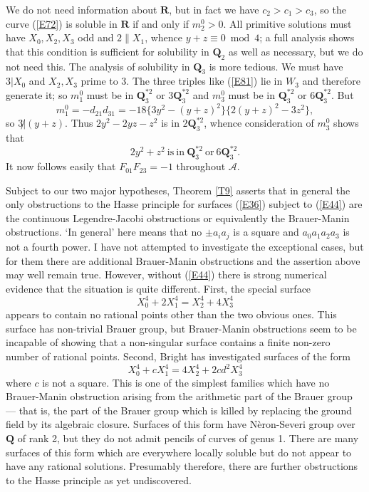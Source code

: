 \documentclass[12pt]{article}
\def\bQ{{\mathbf Q}}
\def\bR{{\mathbf R}}
\def\sA{{\mathcal A}}
\begin{document}
We do not need information about $\bR$, but in fact
we have $c_2>c_1>c_3$, so the curve (\ref{E72}) is
soluble in $\bR$ if and only if $m_2^0>0$. All primitive
solutions must have $X_0,X_2,X_3$ odd and $2\|X_1$, whence
$y+z\equiv0\bmod4$; a full analysis shows that this condition
is sufficient for solubility in $\bQ_2$ as well as necessary,
but we do not need this. The analysis of solubility in $\bQ_3$
is more tedious. We must have $3|X_0$ and $X_2,X_3$ prime to
3. The three triples like (\ref{E81}) lie in
$W_3$ and therefore generate it; so $m_1^0$ must be in
$\bQ^{*2}_3$ or $3\bQ^{*2}_3$ and $m_3^0$ must be in
$\bQ^{*2}_3$ or $6\bQ^{*2}_3$. But
\[ m_1^0=-d_{21}d_{31}=-18\{3y^2-(y+z)^2\}\{2(y+z)^2-3z^2\}, \]
so $3{\not|}(y+z)$. Thus $2y^2-2yz-z^2$ is in $2\bQ_3^{*2}$,
whence consideration of $m_3^0$ shows that
\[ 2y^2+z^2 \mathrm{~is~in~} \bQ^{*2}_3 \mathrm{~or~}
6\bQ^{*2}_3. \]
It now follows easily that
$F_{01}F_{23}=-1$ throughout $\sA$.

\medskip

Subject to our two major hypotheses, Theorem \ref{T9} asserts
that in general the only obstructions to the Hasse principle
for surfaces (\ref{E36}) subject to (\ref{E44}) are the
continuous Legendre-Jacobi obstructions or equivalently the
Brauer-Manin obstructions. `In general' here means that no
$\pm a_ia_j$ is a square and $a_0a_1a_2a_3$ is not a fourth
power. I have not attempted to investigate the exceptional
cases, but for them there are additional Brauer-Manin
obstructions and the assertion above may well remain true.
However, without (\ref{E44}) there is strong numerical
evidence that the situation is quite different. First, the
special surface
\[ X_0^4+2X_1^4=X_2^4+4X_3^4 \]
appears to contain no rational points other than the two
obvious ones. This surface has non-trivial Brauer group, but
Brauer-Manin obstructions seem to be incapable of showing
that a non-singular surface contains a finite non-zero
number of rational points. Second, Bright has investigated
surfaces of the form
\[ X_0^4+cX_1^4=4X_2^4+2cd^2X_3^4 \]
where $c$ is not a square. This is one of the simplest
families which have no Brauer-Manin obstruction arising from
the arithmetic part of the Brauer group --- that is, the part
of the Brauer group which is killed by replacing the ground
field by its algebraic closure. Surfaces of this form have
N\`{e}ron-Severi group over $\bQ$ of rank 2, but they do not
admit pencils of curves of genus 1. There are many surfaces of
this form which are everywhere locally soluble but do not
appear to have any rational solutions. Presumably therefore,
there are further obstructions to the Hasse principle as yet
undiscovered.
\end{document}
